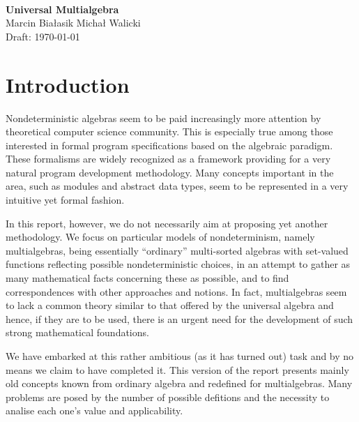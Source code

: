 %



 

\

\vspace{2cm}

\begin{center}
{\Large\bf Universal Multialgebra}\\[0.8cm]
{\Large Marcin Bia\l{}asik \hspace{3cm} Micha\l{} Walicki}\\[0.4cm] 
Draft: \today 
\end{center}
\medskip

%
%
\section{Introduction}

Nondeterministic algebras seem to be paid increasingly more attention
by theoretical computer science community. This is especially true
among those interested in formal program specifications based on the
algebraic paradigm.  These formalisms are widely recognized as a
framework providing for a very natural program development
methodology. Many concepts important in the area, such as modules and
abstract data types, seem to be represented in a very intuitive yet
formal fashion.

In this report, however, we do not necessarily aim at proposing yet
another methodology. We focus on particular models of nondeterminism,
namely multialgebras, being essentially ``ordinary'' multi-sorted
algebras with set-valued functions reflecting possible
nondeterministic choices, in an attempt to gather as many mathematical
facts concerning these as possible, and to find correspondences with
other approaches and notions. In fact, multialgebras seem to lack a
common theory similar to that offered by the universal algebra and
hence, if they are to be used, there is an urgent need for the
development of such strong mathematical foundations.

We have embarked at this rather ambitious (as it has turned out) task
and by no means we claim to have completed it. This version of the
report presents mainly old concepts known from ordinary algebra and
redefined for multialgebras. Many problems are posed by the number of
possible defitions and the necessity to analise each one's value and
applicability.

